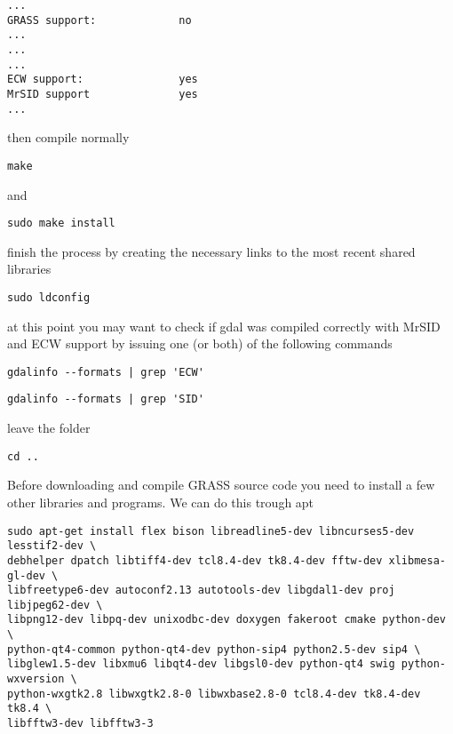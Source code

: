 \begin{verbatim}
...
GRASS support:             no
...
...
...
ECW support:               yes
MrSID support              yes			
...
\end{verbatim}

then compile normally

\begin{verbatim}
make
\end{verbatim}

and

\begin{verbatim}
sudo make install
\end{verbatim}

finish the process by creating the necessary links to the most recent shared libraries

\begin{verbatim}
sudo ldconfig
\end{verbatim}

at this point you may want to check if gdal was compiled correctly with MrSID and ECW
support by issuing one (or both) of the following commands

\begin{verbatim}
gdalinfo --formats | grep 'ECW'
\end{verbatim}

\begin{verbatim}
gdalinfo --formats | grep 'SID'
\end{verbatim}

leave the folder 

\begin{verbatim}
cd ..
\end{verbatim}

\hypertarget{toc59}{}
Before downloading and compile GRASS source code you need to install a few
other libraries and programs. We can do this trough apt

\begin{verbatim}
sudo apt-get install flex bison libreadline5-dev libncurses5-dev lesstif2-dev \
debhelper dpatch libtiff4-dev tcl8.4-dev tk8.4-dev fftw-dev xlibmesa-gl-dev \
libfreetype6-dev autoconf2.13 autotools-dev libgdal1-dev proj libjpeg62-dev \
libpng12-dev libpq-dev unixodbc-dev doxygen fakeroot cmake python-dev \
python-qt4-common python-qt4-dev python-sip4 python2.5-dev sip4 \
libglew1.5-dev libxmu6 libqt4-dev libgsl0-dev python-qt4 swig python-wxversion \
python-wxgtk2.8 libwxgtk2.8-0 libwxbase2.8-0 tcl8.4-dev tk8.4-dev tk8.4 \
libfftw3-dev libfftw3-3
\end{verbatim}

